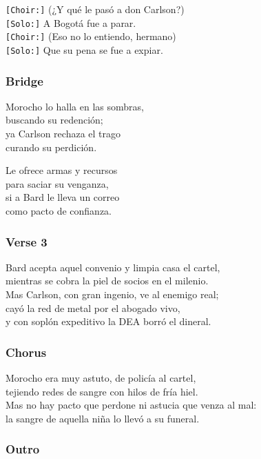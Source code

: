\texttt{{[}Choir:{]}} (¿Y qué le pasó a don Carlson?)\\
\texttt{{[}Solo:{]}} A Bogotá fue a parar.\\
\texttt{{[}Choir:{]}} (Eso no lo entiendo, hermano)\\
\texttt{{[}Solo:{]}} Que su pena se fue a expiar.

\subsubsection{Bridge}\label{bridge-14}

Morocho lo halla en las sombras,\\
buscando su redención;\\
ya Carlson rechaza el trago\\
curando su perdición.

Le ofrece armas y recursos\\
para saciar su venganza,\\
si a Bard le lleva un correo\\
como pacto de confianza.

\subsubsection{Verse 3}\label{verse-3-9}

Bard acepta aquel convenio y limpia casa el cartel,\\
mientras se cobra la piel de socios en el milenio.\\
Mas Carlson, con gran ingenio, ve al enemigo real;\\
cayó la red de metal por el abogado vivo,\\
y con soplón expeditivo la DEA borró el dineral.

\subsubsection{Chorus}\label{chorus-41}

Morocho era muy astuto, de policía al cartel,\\
tejiendo redes de sangre con hilos de fría hiel.\\
Mas no hay pacto que perdone ni astucia que venza al mal:\\
la sangre de aquella niña lo llevó a su funeral.

\subsubsection{Outro}\label{outro-4}

